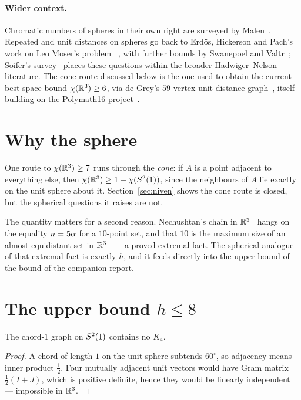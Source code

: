 \paragraph{Wider context.} Chromatic numbers of spheres in their own right are
surveyed by Malen~\cite{Malen2014}. Repeated and unit distances on spheres go
back to Erd\H{o}s, Hickerson and Pach's work on Leo Moser's problem
~\cite{ErdosHickersonPach1989}, with further bounds by Swanepoel and
Valtr~\cite{SwanepoelValtr}; Soifer's survey~\cite{Soifer2008} places these
questions within the broader Hadwiger--Nelson literature. The cone route
discussed below is the one used to obtain the current best space bound
$\chi(\mathbb{R}^3)\ge6$, via de Grey's $59$-vertex unit-distance
graph~\cite{deGrey2020R3}, itself building on the Polymath16
project~\cite{Polymath16}.

\section{Why the sphere}

One route to $\chi(\mathbb{R}^3)\ge7$ runs through the \emph{cone}: if $A$ is a point
adjacent to everything else, then $\chi(\mathbb{R}^3)\ge 1+\chi(S^2(1))$, since the
neighbours of $A$ lie exactly on the unit sphere about it. Section~\ref{sec:niven}
shows the cone route is closed, but the spherical questions it raises are not.

The quantity matters for a second reason. Nechushtan's chain in $\mathbb{R}^3$~\cite{Nechushtan2002} hangs on
the equality $n=5\alpha$ for a $10$-point set, and that $10$ is the maximum size
of an almost-equidistant set in $\mathbb{R}^3$~\cite{Gyorey2020} --- a proved extremal fact. The spherical
analogue of that extremal fact is exactly $h$, and it feeds directly into the
upper bound of the bound of the companion report.

\section{The upper bound $h\le8$}

\begin{lemma}[$K_4$-freeness]
\label{lem:k4free}
The chord-$1$ graph on $S^2(1)$ contains no $K_4$.
\end{lemma}

\begin{proof}
A chord of length $1$ on the unit sphere subtends $60^\circ$, so adjacency means
inner product $\tfrac12$. Four mutually adjacent unit vectors would have Gram
matrix $\tfrac12(I+J)$, which is positive definite, hence they would be linearly
independent --- impossible in $\mathbb{R}^3$.
\end{proof}

